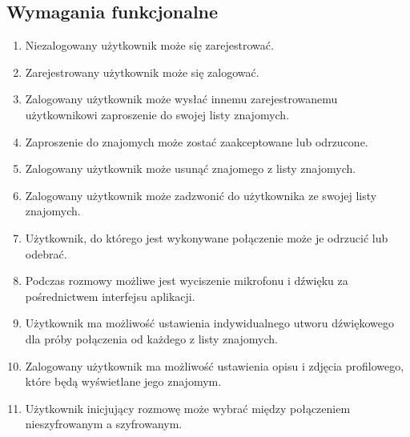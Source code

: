 \documentclass{article}
\begin{document}
  \subsection{Wymagania funkcjonalne}
  \begin{enumerate}
    \item Niezalogowany użytkownik może się zarejestrować.
    \item Zarejestrowany użytkownik może się zalogować.
    \item Zalogowany użytkownik może wysłać innemu zarejestrowanemu użytkownikowi zaproszenie do swojej listy znajomych.
    \item Zaproszenie do znajomych może zostać zaakceptowane lub odrzucone.
    \item Zalogowany użytkownik może usunąć znajomego z listy znajomych.
    \item Zalogowany użytkownik może zadzwonić do użytkownika ze swojej listy znajomych.
    \item Użytkownik, do którego jest wykonywane połączenie może je odrzucić lub odebrać.
    \item Podczas rozmowy możliwe jest wyciszenie mikrofonu i dźwięku za pośrednictwem interfejsu aplikacji.
    \item Użytkownik ma możliwość ustawienia indywidualnego utworu dźwiękowego dla próby połączenia od każdego z listy znajomych.
    \item Zalogowany użytkownik ma możliwość ustawienia opisu i zdjęcia profilowego, które będą wyświetlane jego znajomym.
    \item Użytkownik inicjujący rozmowę może wybrać między połączeniem nieszyfrowanym a szyfrowanym.
  \end{enumerate}
\end{document}
